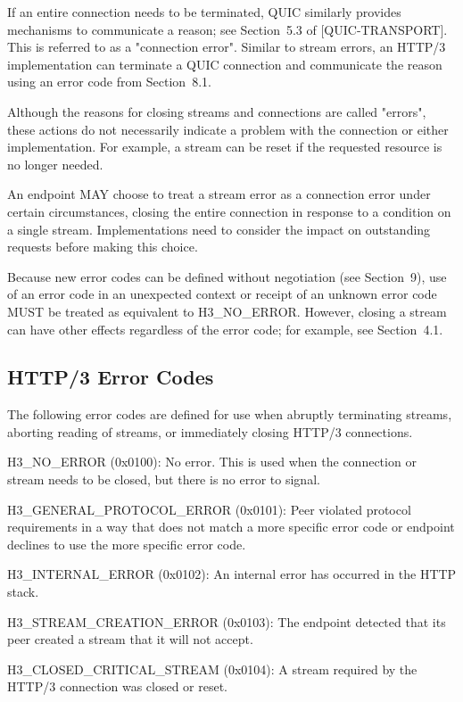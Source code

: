 \documentclass{article}
\begin{document}
If an entire connection needs to be terminated, QUIC similarly provides mechanisms to communicate a reason; see Section~5.3 of [QUIC-TRANSPORT].  This is referred to as a "connection error". Similar to stream errors, an HTTP/3 implementation can terminate a QUIC connection and communicate the reason using an error code from Section~8.1.

Although the reasons for closing streams and connections are called "errors", these actions do not necessarily indicate a problem with the connection or either implementation.  For example, a stream can be reset if the requested resource is no longer needed.

An endpoint MAY choose to treat a stream error as a connection error under certain circumstances, closing the entire connection in response to a condition on a single stream.  Implementations need to consider the impact on outstanding requests before making this choice.

Because new error codes can be defined without negotiation (see Section~9), use of an error code in an unexpected context or receipt of an unknown error code MUST be treated as equivalent to H3\_NO\_ERROR.  However, closing a stream can have other effects regardless of the error code; for example, see Section~4.1.

\subsection{HTTP/3 Error Codes}

The following error codes are defined for use when abruptly terminating streams, aborting reading of streams, or immediately closing HTTP/3 connections.

H3\_NO\_ERROR (0x0100):  No error.  This is used when the connection or stream needs to be closed, but there is no error to signal.

H3\_GENERAL\_PROTOCOL\_ERROR (0x0101):  Peer violated protocol requirements in a way that does not match a more specific error code or endpoint declines to use the more specific error code.

H3\_INTERNAL\_ERROR (0x0102):  An internal error has occurred in the HTTP stack.

H3\_STREAM\_CREATION\_ERROR (0x0103):  The endpoint detected that its peer created a stream that it will not accept.

H3\_CLOSED\_CRITICAL\_STREAM (0x0104):  A stream required by the HTTP/3 connection was closed or reset.
\end{document}
